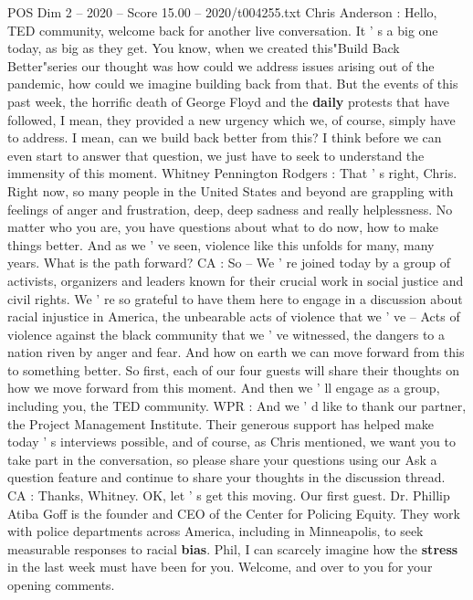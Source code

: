 \begin{textsample}{POS Dim 2 – 2020 – Score 15.00 – 2020/t004255.txt}  \label{ex:f2_pos_020}
Chris Anderson : Hello, TED community, welcome back for another live conversation.
It ' s a big one today, as big as they get.
You know, when we created this"Build Back Better"series our thought was how could we address issues arising out of the pandemic, how could we imagine building back from that.
But the events of this past week, the horrific death of George Floyd and the \textbf{daily} protests that have followed, I mean, they provided a new urgency which we, of course, simply have to address.
I mean, can we build back better from this?
I think before we can even start to answer that question, we just have to seek to understand the immensity of this moment.
Whitney Pennington Rodgers : That ' s right, Chris.
Right now, so many people in the United States and beyond are grappling with feelings of anger and frustration, deep, deep sadness and really helplessness.
No matter who you are, you have questions about what to do now, how to make things better.
And as we ' ve seen, violence like this unfolds for many, many years.
What is the path forward?
CA : So -- We ' re joined today by a group of activists, organizers and leaders known for their crucial work in social justice and civil rights.
We ' re so grateful to have them here to engage in a discussion about racial injustice in America, the unbearable acts of violence that we ' ve -- Acts of violence against the black community that we ' ve witnessed, the dangers to a nation riven by anger and fear.
And how on earth we can move forward from this to something better.
So first, each of our four guests will share their thoughts on how we move forward from this moment.
And then we ' ll engage as a group, including you, the TED community.
WPR : And we ' d like to thank our partner, the Project Management Institute.
Their generous support has helped make today ' s interviews possible, and of course, as Chris mentioned, we want you to take part in the conversation, so please share your questions using our Ask a question feature and continue to share your thoughts in the discussion thread.
CA : Thanks, Whitney.
OK, let ' s get this moving.
Our first guest.
Dr.
Phillip Atiba Goff is the founder and CEO of the Center for Policing Equity.
They work with police departments across America, including in Minneapolis, to seek measurable responses to racial \textbf{bias}.
Phil, I can scarcely imagine how the \textbf{stress} in the last week must have been for you.
Welcome, and over to you for your opening comments.

\end{textsample}
